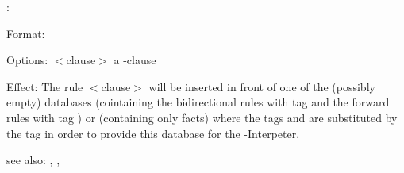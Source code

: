 :

Format: 

Options: $<$clause$>$ a \COLAB{}-clause

Effect: The rule $<$clause$>$ will be inserted in front of one of the (possibly 
        empty) \FORWARD{} databases  (cointaining the bidirectional 
        rules with tag  and the forward rules with tag ) or 
        (containing only facts) where the tags  and  are substituted
	by the tag  in order to provide this database for the
	\RELFUN-Interpeter.

see also: \consult, \destroy, \replace
